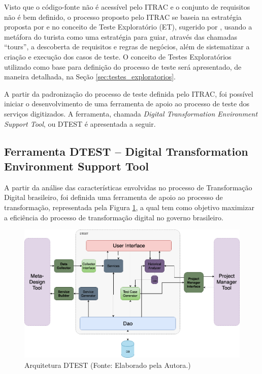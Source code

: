 Visto que o código-fonte não é acessível pelo ITRAC e o conjunto de requisitos não é bem definido, o processo proposto pelo ITRAC se baseia na estratégia proposta por \cite{elcock2006testing} e no conceito de Teste Exploratório (ET), sugerido por \cite{whittaker2009exploratory}, usando a metáfora do turista como uma estratégia para guiar, através das chamadas ``tours'', a descoberta de requisitos e regras de negócios, além de sistematizar a criação e execução dos casos de teste. O conceito de Testes Exploratórios utilizado como base para definição do processo de teste será apresentado, de maneira detalhada, na Seção \ref{sec:testes_exploratorios}.


A partir da padronização do processo de teste definida pelo ITRAC, foi possível iniciar o desenvolvimento de uma ferramenta de apoio ao processo de teste dos serviços digitizados. A ferramenta, chamada \textit{Digital Transformation Environment Support Tool}, ou DTEST é apresentada a seguir.

\subsection[DTEST]{Ferramenta DTEST -- Digital Transformation Environment Support Tool}
\label{sec:dtest}

A partir da análise das características envolvidas no processo de Transformação Digital brasileiro, foi definida uma ferramenta de apoio ao processo de transformação, representada pela Figura \ref{img:architecture}, a qual tem como objetivo maximizar a eficiência do processo de transformação digital no governo brasileiro.

\begin{figure}[!htb]
\centering
\includegraphics[width=1\textwidth]{figuras/arquitetura_sem_tester.png}
\caption{Arquitetura DTEST (Fonte: Elaborado pela Autora.)}
\label{img:architecture}
\end{figure}

